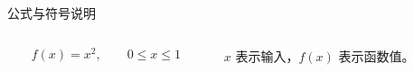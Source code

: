 \begin{frame}{公式与符号说明}
  \begin{columns}[c,onlytextwidth]
    \begin{column}{\hitleftwidth}
      \[ f(x)=x^2,\qquad 0\leq x\leq1 \]
    \end{column}
    \begin{column}{\hitrightwidth}
      $x$ 表示输入，$f(x)$ 表示函数值。
    \end{column}
  \end{columns}
\end{frame}
